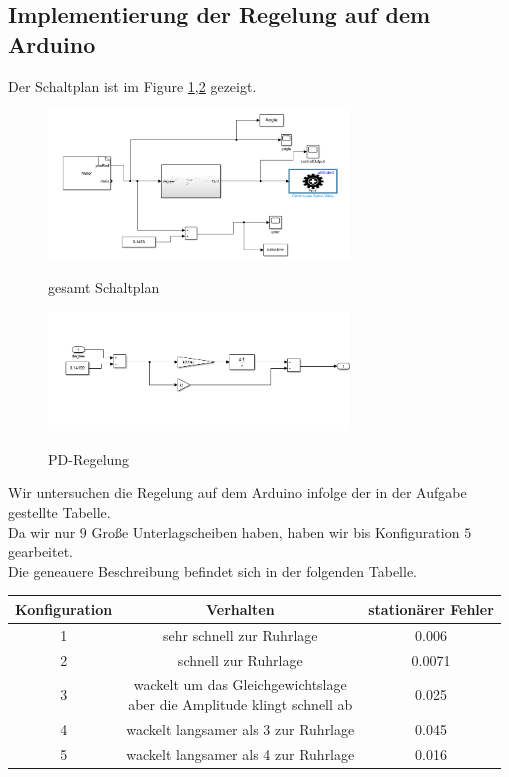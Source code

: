 \documentclass{article}
\begin{document}
\subsection{Implementierung der Regelung auf dem Arduino}
Der Schaltplan ist im Figure \ref{fig:a239},\ref{fig:a24Sub} gezeigt.\\
\begin{figure}[h]
  \caption{gesamt Schaltplan}
  \centering
  \includegraphics[width=8cm]{images/a239.PNG}
  \label{fig:a239}
\end{figure}
\begin{figure}[h]
  \caption{PD-Regelung}
  \centering
  \includegraphics[width=8cm]{a24Sub1}
  \label{fig:a24Sub}
\end{figure}
Wir untersuchen die Regelung auf dem Arduino infolge der in der Aufgabe gestellte Tabelle.\\
Da wir nur $9$ Große Unterlagscheiben haben, haben wir bis Konfiguration $5$ gearbeitet. \\
Die geneauere Beschreibung befindet sich in der folgenden Tabelle. \\
\begin{center}
  \begin{tabular}{ |c|c|c|}
    \hline
    Konfiguration & Verhalten & stationärer Fehler \\
    \hline
    1 & sehr schnell zur Ruhrlage & 0.006 \\
    \hline
    2 & schnell zur Ruhrlage & 0.0071 \\
    \hline
    3 &  \shortstack{wackelt um das Gleichgewichtslage \\ aber die Amplitude klingt schnell ab} & 0.025 \\
    \hline
    4 & wackelt langsamer als 3 zur Ruhrlage & 0.045 \\
    \hline
    5 & wackelt langsamer als 4 zur Ruhrlage & 0.016 \\
    \hline
  \end{tabular}
\end{center}
\end{document}
